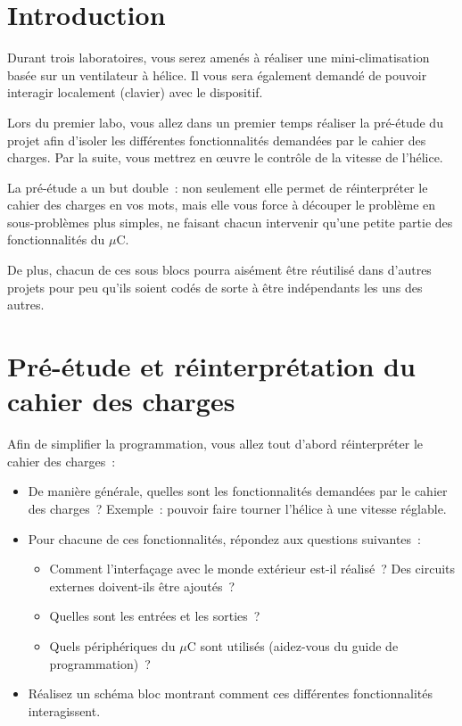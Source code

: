 \documentclass[11pt,a4paper]{article}
\theoremstyle{definition}%
\begin{document}
\section{Introduction}
Durant trois laboratoires, vous serez amenés à réaliser une mini-climatisation basée sur un ventilateur à hélice.
Il vous sera également demandé de pouvoir interagir localement (clavier) avec le dispositif.

Lors du premier labo, vous allez dans un premier temps réaliser la pré-étude du projet afin d’isoler les différentes fonctionnalités demandées par le cahier des charges.
Par la suite, vous mettrez en œuvre le contrôle de la vitesse de l’hélice.

La pré-étude a un but double~: non seulement elle permet de réinterpréter le cahier des charges en vos mots, mais elle vous force à découper le problème en sous-problèmes plus simples, ne faisant chacun intervenir qu’une petite partie des fonctionnalités du $\mu$C.

De plus, chacun de ces sous blocs pourra aisément être réutilisé dans d’autres projets pour peu qu’ils soient codés de sorte à être indépendants les uns des autres.







\section{Pré-étude et réinterprétation du cahier des charges}
Afin de simplifier la programmation, vous allez tout d’abord réinterpréter le cahier des charges~:
\begin{itemize}
	\item De manière générale, quelles sont les fonctionnalités demandées par le cahier des charges~?
	Exemple~: pouvoir faire tourner l’hélice à une vitesse réglable.
	\item Pour chacune de ces fonctionnalités, répondez aux questions suivantes~:
	\begin{itemize}
		\item Comment l’interfaçage avec le monde extérieur est-il réalisé~?
		Des circuits externes doivent-ils être ajoutés~?
		\item Quelles sont les entrées et les sorties~?
		\item Quels périphériques du $\mu$C sont utilisés (aidez-vous du guide de programmation)~?
	\end{itemize}
	\item Réalisez un schéma bloc montrant comment ces différentes fonctionnalités interagissent.
\end{itemize}
\end{document}

